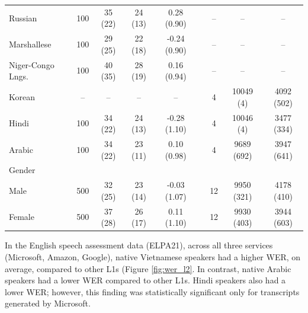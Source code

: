 \documentclass [PhD] {uclathes}
\begin{document}
\begin{table}
\begin{tabular}{lcccccccc}
\hspace{3mm} Russian & 100 & 35 (22) & 24 (13) & 0.28 (0.90) & & -- & -- & -- \\
\hspace{3mm} Marshallese & 100 & 29 (25) & 22 (18) & -0.24 (0.90) & & -- & -- & -- \\
\hspace{3mm} Niger-Congo Lngs. & 100 & 40 (35) & 28 (19) & 0.16 (0.94) & & -- & -- & -- \\
\hspace{3mm} Korean & -- & -- & -- & -- & & 4 & 10049 (4) & 4092 (502) \\
\hspace{3mm} Hindi & 100 & 34 (22) & 24 (13) & -0.28 (1.10) & & 4 & 10046 (4) & 3477 (334) \\
\hspace{3mm} Arabic & 100 & 34 (22) & 23 (11) & 0.10 (0.98) & & 4 & 9689 (692) & 3947 (641) \\
Gender &  &  &  &  & &  &  &  \\
\hspace{3mm} Male & 500 & 32 (25) & 23 (14) & -0.03 (1.07) & & 12 & 9950 (321) & 4178 (410) \\
\hspace{3mm} Female & 500 & 37 (28) & 26 (17) & 0.11 (1.10) & & 12 & 9930 (403) & 3944 (603) \\
\bottomrule
  \end{tabular}
\end{table}

In the English speech assessment data (ELPA21), across all three services (Microsoft, Amazon, Google), native Vietnamese speakers had a higher WER, on average, compared to other L1s (Figure \ref{fig:wer_l2}. In contrast, native Arabic speakers had a lower WER compared to other L1s. Hindi speakers also had a lower WER; however, this finding was statistically significant only for transcripts generated by Microsoft. 
\end{document}
